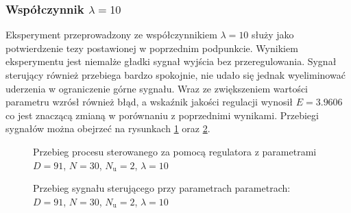 \subsubsection{Współczynnik $\lambda = 10$}
Eksperyment przeprowadzony ze współczynnikiem $\lambda = 10$ służy jako potwierdzenie tezy postawionej w poprzednim podpunkcie. Wynikiem eksperymentu jest niemalże gładki sygnał wyjścia bez przeregulowania. Sygnał sterujący również przebiega bardzo spokojnie, nie udało się jednak wyeliminować uderzenia w ograniczenie górne sygnału. Wraz ze zwiększeniem wartości parametru wzrósł również błąd, a wskaźnik jakości regulacji wynosił $E = \num{3,9606}$ co jest znaczącą zmianą w porównaniu z poprzednimi wynikami. Przebiegi sygnałów można obejrzeć na rysunkach \ref{dmc_lam_10_y} oraz \ref{dmc_lam_10_u}.
	
\begin{figure}[t]
    \centering
    \caption{Przebieg procesu sterowanego za pomocą regulatora z parametrami $D = 91$, $N = 30$, $N_{\mathrm{u}} = 2$, $\lambda = 10$}
    \label{dmc_lam_10_y}
\end{figure}

\begin{figure}[b]
    \centering
    \caption{Przebieg sygnału sterującego przy parametrach parametrach: $D = 91$, $N = 30$, $N_{\mathrm{u}} = 2$, $\lambda = 10$}
    \label{dmc_lam_10_u}
\end{figure}
\FloatBarrier
